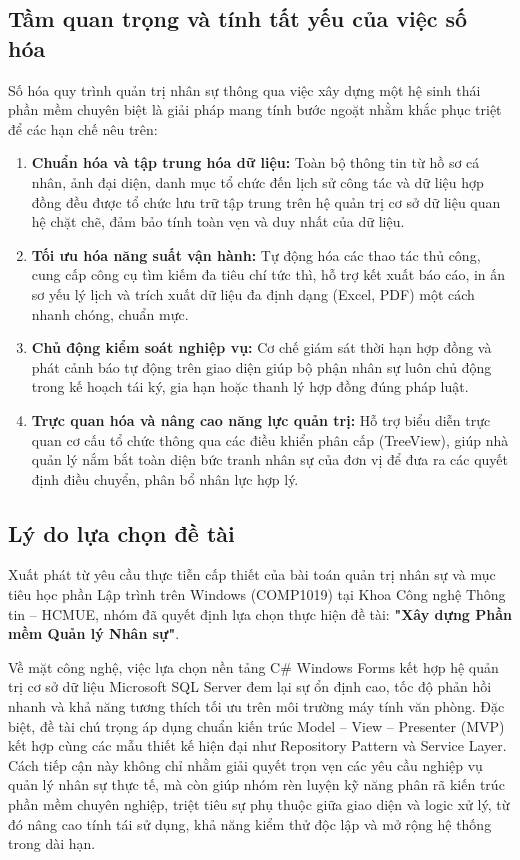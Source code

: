 \documentclass[12pt,a4paper]{report}
\begin{document}
\subsection*{Tầm quan trọng và tính tất yếu của việc số hóa}
Số hóa quy trình quản trị nhân sự thông qua việc xây dựng một hệ sinh thái phần mềm chuyên biệt là giải pháp mang tính bước ngoặt nhằm khắc phục triệt để các hạn chế nêu trên:
\begin{enumerate}[leftmargin=1.0cm]
    \item \textbf{Chuẩn hóa và tập trung hóa dữ liệu:} Toàn bộ thông tin từ hồ sơ cá nhân, ảnh đại diện, danh mục tổ chức đến lịch sử công tác và dữ liệu hợp đồng đều được tổ chức lưu trữ tập trung trên hệ quản trị cơ sở dữ liệu quan hệ chặt chẽ, đảm bảo tính toàn vẹn và duy nhất của dữ liệu.
    \item \textbf{Tối ưu hóa năng suất vận hành:} Tự động hóa các thao tác thủ công, cung cấp công cụ tìm kiếm đa tiêu chí tức thì, hỗ trợ kết xuất báo cáo, in ấn sơ yếu lý lịch và trích xuất dữ liệu đa định dạng (Excel, PDF) một cách nhanh chóng, chuẩn mực.
    \item \textbf{Chủ động kiểm soát nghiệp vụ:} Cơ chế giám sát thời hạn hợp đồng và phát cảnh báo tự động trên giao diện giúp bộ phận nhân sự luôn chủ động trong kế hoạch tái ký, gia hạn hoặc thanh lý hợp đồng đúng pháp luật.
    \item \textbf{Trực quan hóa và nâng cao năng lực quản trị:} Hỗ trợ biểu diễn trực quan cơ cấu tổ chức thông qua các điều khiển phân cấp (TreeView), giúp nhà quản lý nắm bắt toàn diện bức tranh nhân sự của đơn vị để đưa ra các quyết định điều chuyển, phân bổ nhân lực hợp lý.
\end{enumerate}

\subsection*{Lý do lựa chọn đề tài}
Xuất phát từ yêu cầu thực tiễn cấp thiết của bài toán quản trị nhân sự và mục tiêu học phần Lập trình trên Windows (COMP1019) tại Khoa Công nghệ Thông tin -- HCMUE, nhóm đã quyết định lựa chọn thực hiện đề tài: \textbf{"Xây dựng Phần mềm Quản lý Nhân sự"}.

Về mặt công nghệ, việc lựa chọn nền tảng C\# Windows Forms kết hợp hệ quản trị cơ sở dữ liệu Microsoft SQL Server đem lại sự ổn định cao, tốc độ phản hồi nhanh và khả năng tương thích tối ưu trên môi trường máy tính văn phòng. Đặc biệt, đề tài chú trọng áp dụng chuẩn kiến trúc Model -- View -- Presenter (MVP) kết hợp cùng các mẫu thiết kế hiện đại như Repository Pattern và Service Layer. Cách tiếp cận này không chỉ nhằm giải quyết trọn vẹn các yêu cầu nghiệp vụ quản lý nhân sự thực tế, mà còn giúp nhóm rèn luyện kỹ năng phân rã kiến trúc phần mềm chuyên nghiệp, triệt tiêu sự phụ thuộc giữa giao diện và logic xử lý, từ đó nâng cao tính tái sử dụng, khả năng kiểm thử độc lập và mở rộng hệ thống trong dài hạn.
\end{document}

